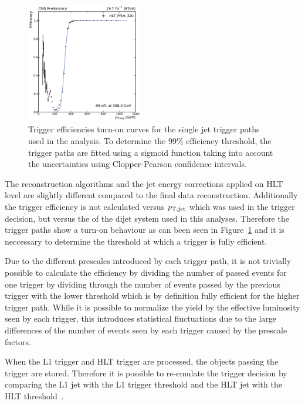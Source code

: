 \begin{figure}[htbp]
    \includegraphics[width=0.45\textwidth]{figures/measurement/trigger_eff_hltpfjet320.pdf}\hfill
    \caption{Trigger efficiencies turn-on curves for the single jet trigger
    paths used in the analysis. To determine the 99\% efficiency threshold, the
    trigger paths are fitted using a sigmoid function taking into account the
    uncertainties using Clopper-Pearson confidence intervals.}
    \label{fig:trigger_eff}
\end{figure}

The reconstruction algorithms and the jet energy corrections applied on HLT
level are slightly different compared to the final data reconstruction.
Additionally the trigger efficiency is not calculated versus $p_{\mathrm{T,jet}}$ which was
used in the trigger decision, but versus the \ptavg of the dijet system used in
this analyses. Therefore the trigger paths show a turn-on behaviour as can been seen in
Figure~\ref{fig:trigger_eff} and it is neccessary to determine the threshold at
which a trigger is fully efficient.

Due to the different prescales introduced by each trigger path, it is not
trivially possible to calculate the efficiency by dividing the number of passed events for
one trigger by dividing through the number of events passed by the previous
trigger with the lower \pt threshold which is by definition fully efficient for
the higher trigger path. While it is possible to normalize the yield by the
effective luminosity seen by each trigger, this introduces statistical
fluctuations due to the large differences of the number of events seen by each
trigger caused by the prescale factors.

When the L1 trigger and HLT trigger are processed, the objects passing the
trigger are stored. Therefore it is possible to re-emulate the trigger decision
by comparing the L1 jet \pt with the L1 trigger threshold and the HLT jet \pt
with the HLT threshold~\cite{Stober:2012abc}.

